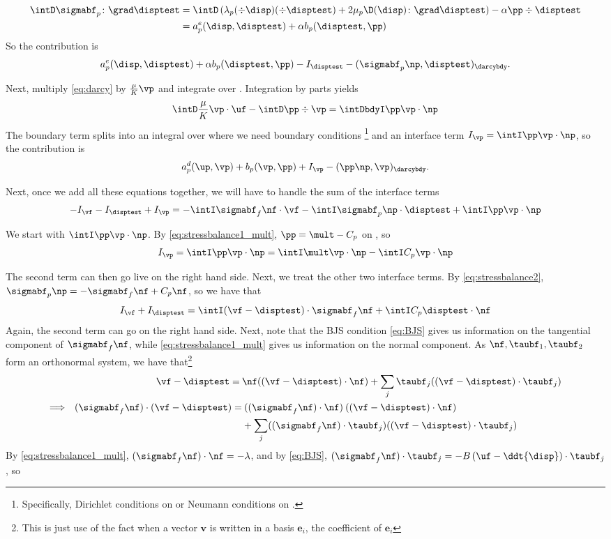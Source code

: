 \documentclass{article}
\begin{document}
\begin{align*}
  \intD \sigmabf_p \colon \grad \disptest &=  \intD  \left ( \lambda_p (\div \disp)(\div \disptest)  + 2 \mu_p \D(\disp) \colon \grad \disptest \right)
                                            - \alpha \pp \div \disptest \\
                                          &= a^e_p(\disp, \disptest) + \alpha b_p(\disptest, \pp)
\end{align*}
So the contribution is $$a^e_p(\disp, \disptest) + \alpha b_p(\disptest, \pp) - I_{\disptest} - (\sigmabf_p\np, \disptest)_{\darcybdy}.$$

Next, multiply \eqref{eq:darcy} by $\frac {\mu} {K} \vp$ and integrate over \darcybdy. Integration by parts yields
$$ \intD \frac {\mu} {K} \vp \cdot \uf -  \intD \pp \div \vp = \intDbdyI \pp \vp \cdot \np$$ 
The boundary term splits into an integral over \darcybdy where we need boundary conditions \footnote{Specifically, Dirichlet conditions on \up or Neumann conditions on \pp.} and an interface term $I_{\vp} = \intI \pp \vp \cdot \np$, so the contribution is
$$a_p^d(\up, \vp) + b_p(\vp, \pp) + I_{\vp} - (\pp \np, \vp)_{\darcybdy}.$$

Next, once we add all these equations together, we will have to handle the sum of the interface terms $$-I_{\vf} - I_{\disptest} + I_{\vp} = -\intI \sigmabf_f \nf \cdot \vf -\intI \sigmabf_p \np \cdot \disptest + \intI \pp \vp \cdot \np$$

We start with $\intI \pp \vp \cdot \np$. By \eqref{eq:stressbalance1_mult}, $\pp = \mult - C_p$ on \interface, so
$$I_{\vp} = \intI \pp \vp \cdot \np = \intI \mult \vp \cdot \np - \intI C_p \vp \cdot \np$$

The second term can then go live on the right hand side. Next, we treat the other two interface terms. By \eqref{eq:stressbalance2}, $\sigmabf_p \np = - \sigmabf_f \nf + C_p \nf$, so we have that $$I_{\vf} + I_{\disptest} = \intI (\vf - \disptest) \cdot \sigmabf_f \nf + \intI C_p \disptest \cdot  \nf$$
Again, the second term can go on the right hand side. Next, note that the BJS condition \eqref{eq:BJS} gives us information on the tangential component of $\sigmabf_f \nf$, while \eqref{eq:stressbalance1_mult} gives us information on the normal component. As $\nf, \taubf_1, \taubf_2$ form an orthonormal system, we have that\footnote{This is just use of the fact when a vector $\mathbf{v}$ is written in a basis $\mathbf{e}_i$, the coefficient of $\mathbf{e}_i$    }
\begin{align*}
  \vf - \disptest = \: &\nf ((\vf - \disptest) \cdot \nf) + \sum_j \taubf_j ((\vf - \disptest) \cdot \taubf_j) \\
  \Longrightarrow \hspace{0.02\textwidth}  (\sigmabf_f \nf) \cdot (\vf - \disptest) = & \: ((\sigmabf_f \nf) \cdot \nf) \: ((\vf - \disptest) \cdot \nf) \\
  & + \sum_j ((\sigmabf_f \nf) \cdot \taubf_j) ((\vf - \disptest) \cdot \taubf_j)
\end{align*}
By \eqref{eq:stressbalance1_mult}, $(\sigmabf_f \nf) \cdot \nf = -\lambda$, and by \eqref{eq:BJS}, $(\sigmabf_f \nf) \cdot \taubf_j = -B \left ( \uf - \ddt{\disp} \right ) \cdot \taubf_j$, so
\end{document}
